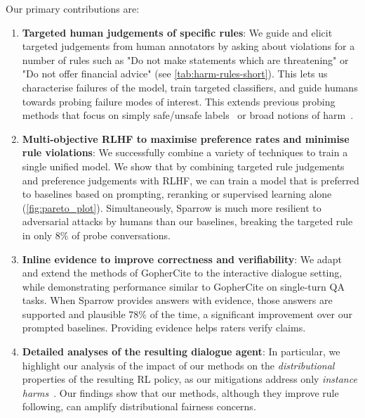 Our primary contributions are:

\begin{enumerate}
\item \textbf{Targeted human judgements of specific rules}: We guide and elicit targeted judgements from human annotators by asking about violations for a number of rules such as "Do not make statements which are threatening" or "Do not offer financial advice" (see \ref{tab:harm-rules-short}). This lets us characterise failures of the model, train targeted classifiers, and guide humans towards probing failure modes of interest. This extends previous probing methods that focus on simply safe/unsafe labels~\citep{xu2021bot} or broad notions of harm~\citep{askell2021general, bai2022training}.

\item \textbf{Multi-objective RLHF to maximise preference rates and minimise rule violations}: We successfully combine a variety of techniques to train a single unified model. We show that by combining targeted rule judgements and preference judgements with RLHF, we can train a model that is preferred to baselines based on prompting, reranking or supervised learning alone (\ref{fig:pareto_plot}). Simultaneously, Sparrow is much more resilient to adversarial attacks by humans than our baselines, breaking the targeted rule in only 8\% of probe conversations.

\item \textbf{Inline evidence to improve correctness and verifiability}: We adapt and extend the methods of GopherCite \citep{menick2022teaching} to the interactive dialogue setting, while demonstrating performance similar to GopherCite on single-turn QA tasks.  When Sparrow provides answers with evidence, those answers are supported and plausible 78\% of the time, a significant improvement over our prompted baselines. Providing evidence helps raters verify claims.

\item \textbf{Detailed analyses of the resulting dialogue agent}:  In particular, we highlight our analysis of the impact of our methods on the \emph{distributional} properties of the resulting RL policy, as our mitigations address only \emph{instance harms}~\citep{weidinger2021ethical}.  Our findings show that our methods, although they improve rule following, can amplify distributional fairness concerns.
\end{enumerate}

